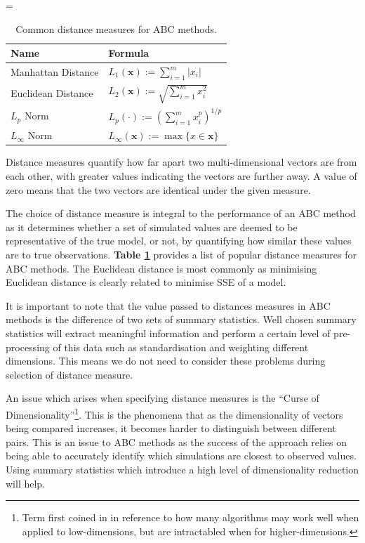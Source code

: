\documentclass[11pt,a4paper]{article}
\theoremstyle{break}
\begin{document}
  \begin{table}[H]
    \everymath={\displaystyle}
    \centering
    \begin{tabular}{|l|l|}
      \hline
      \textbf{Name}&\textbf{Formula}\\\hline
      Manhattan Distance&$L_1(\mathbf{x}):=\sum_{i=1}^m|x_i|$\\\hline
      Euclidean Distance&$L_2(\mathbf{x}):=\sqrt{\sum_{i=1}^mx_i^2}$\\\hline
      $L_p$ Norm&$L_p(\cdot):=\left(\sum_{i=1}^mx_i^p\right)^{1/p}$\\\hline
      $L_\infty$ Norm&$L_\infty(\mathbf{x}):=\max\{x\in \mathbf{x}\}$\\\hline
    \end{tabular}
    \caption{Common distance measures for ABC methods.}
    \label{tab_common_distances}
  \end{table}

  \par Distance measures quantify how far apart two multi-dimensional vectors are from each other, with greater values indicating the vectors are further away. A value of zero means that the two vectors are identical under the given measure.

  \par The choice of distance measure is integral to the performance of an ABC method as it determines whether a set of simulated values are deemed to be representative of the true model, or not, by quantifying how similar these values are to true observations. \textbf{Table \ref{tab_common_distances}} provides a list of popular distance measures for ABC methods. The Euclidean distance is most commonly as minimising Euclidean distance is clearly related to minimise SSE of a model.

  \par It is important to note that the value passed to distances measures in ABC methods is the difference of two sets of summary statistics. Well chosen summary statistics will extract meaningful information and perform a certain level of pre-processing of this data such as standardisation and weighting different dimensions. This means we do not need to consider these problems during selection of distance measure.

  \par An issue which arises when specifying distance measures is the ``Curse of Dimensionality''\footnote{Term first coined in \cite[]{adaptive_control_processes} in reference to how many algorithms may work well when applied to low-dimensions, but are intractabled when for higher-dimensions.}. This is the phenomena that as the dimensionality of vectors being compared increases, it becomes harder to distinguish between different pairs. This is an issue to ABC methods as the success of the approach relies on being able to accurately identify which simulations are closest to observed values. Using summary statistics which introduce a high level of dimensionality reduction will help.
\end{document}
